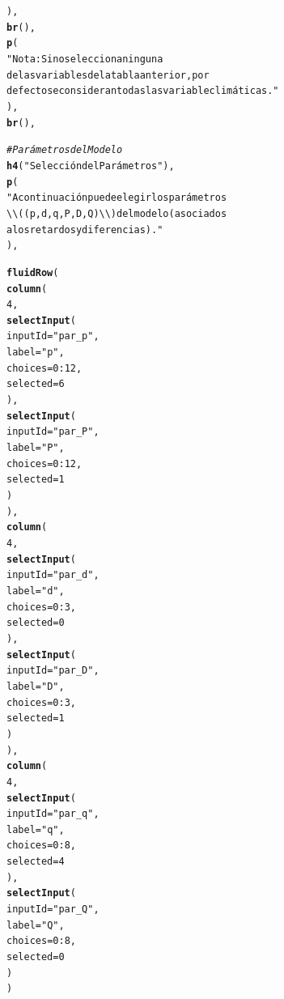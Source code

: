 \documentclass[12pt,oneside]{book}\usepackage[]{graphicx}\usepackage[]{color}
\makeatletter
\newcommand{\hlnum}[1]{\textcolor[rgb]{0.686,0.059,0.569}{#1}}%
\newcommand{\hlstr}[1]{\textcolor[rgb]{0.192,0.494,0.8}{#1}}%
\newcommand{\hlcom}[1]{\textcolor[rgb]{0.678,0.584,0.686}{\textit{#1}}}%
\newcommand{\hlopt}[1]{\textcolor[rgb]{0,0,0}{#1}}%
\newcommand{\hlstd}[1]{\textcolor[rgb]{0.345,0.345,0.345}{#1}}%
\newcommand{\hlkwc}[1]{\textcolor[rgb]{0.333,0.667,0.333}{#1}}%
\newcommand{\hlkwd}[1]{\textcolor[rgb]{0.737,0.353,0.396}{\textbf{#1}}}%
\newenvironment{kframe}{%
 \def\at@end@of@kframe{}%
 \ifinner\ifhmode%
  \def\at@end@of@kframe{\end{minipage}}%
  \begin{minipage}{\columnwidth}%
 \fi\fi%
 \def\FrameCommand##1{\hskip\@totalleftmargin \hskip-\fboxsep
 \colorbox{shadecolor}{##1}\hskip-\fboxsep
     \hskip-\linewidth \hskip-\@totalleftmargin \hskip\columnwidth}%
 \MakeFramed {\advance\hsize-\width
   \@totalleftmargin\z@ \linewidth\hsize
   \@setminipage}}%
 {\par\unskip\endMakeFramed%
 \at@end@of@kframe}
\newenvironment{knitrout}{}{} %
\theoremstyle{definition} %
\makeatother
\begin{document}
\begin{knitrout}
\begin{kframe}
\begin{alltt}
    \hlstd{),}
    \hlkwd{br}\hlstd{(),}
    \hlkwd{p}\hlstd{(}
      \hlstr{"Nota: Si no selecciona ninguna
      de las variables de la tabla anterior, por
      defecto se consideran todas las variable climáticas."}
    \hlstd{),}
    \hlkwd{br}\hlstd{(),}

    \hlcom{#Parámetros del Modelo}
    \hlkwd{h4}\hlstd{(}\hlstr{"Selección del Parámetros"}\hlstd{),}
    \hlkwd{p}\hlstd{(}
      \hlstr{"A continuación puede elegir los parámetros
      \textbackslash{}\textbackslash{}( (p,d,q,P,D,Q)\textbackslash{}\textbackslash{}) del modelo (asociados
      a los retardos y diferencias)."}
    \hlstd{),}

    \hlkwd{fluidRow}\hlstd{(}
      \hlkwd{column}\hlstd{(}
        \hlnum{4}\hlstd{,}
        \hlkwd{selectInput}\hlstd{(}
          \hlkwc{inputId} \hlstd{=} \hlstr{"par_p"}\hlstd{,}
          \hlkwc{label} \hlstd{=} \hlstr{"p"}\hlstd{,}
          \hlkwc{choices} \hlstd{=} \hlnum{0}\hlopt{:}\hlnum{12}\hlstd{,}
          \hlkwc{selected} \hlstd{=} \hlnum{6}
        \hlstd{),}
        \hlkwd{selectInput}\hlstd{(}
          \hlkwc{inputId} \hlstd{=} \hlstr{"par_P"}\hlstd{,}
          \hlkwc{label} \hlstd{=} \hlstr{"P"}\hlstd{,}
          \hlkwc{choices} \hlstd{=} \hlnum{0}\hlopt{:}\hlnum{12}\hlstd{,}
          \hlkwc{selected} \hlstd{=} \hlnum{1}
        \hlstd{)}
      \hlstd{),}
      \hlkwd{column}\hlstd{(}
        \hlnum{4}\hlstd{,}
        \hlkwd{selectInput}\hlstd{(}
          \hlkwc{inputId} \hlstd{=} \hlstr{"par_d"}\hlstd{,}
          \hlkwc{label} \hlstd{=} \hlstr{"d"}\hlstd{,}
          \hlkwc{choices} \hlstd{=} \hlnum{0}\hlopt{:}\hlnum{3}\hlstd{,}
          \hlkwc{selected} \hlstd{=} \hlnum{0}
        \hlstd{),}
        \hlkwd{selectInput}\hlstd{(}
          \hlkwc{inputId} \hlstd{=} \hlstr{"par_D"}\hlstd{,}
          \hlkwc{label} \hlstd{=} \hlstr{"D"}\hlstd{,}
          \hlkwc{choices} \hlstd{=} \hlnum{0}\hlopt{:}\hlnum{3}\hlstd{,}
          \hlkwc{selected} \hlstd{=} \hlnum{1}
        \hlstd{)}
      \hlstd{),}
      \hlkwd{column}\hlstd{(}
        \hlnum{4}\hlstd{,}
        \hlkwd{selectInput}\hlstd{(}
          \hlkwc{inputId} \hlstd{=} \hlstr{"par_q"}\hlstd{,}
          \hlkwc{label} \hlstd{=} \hlstr{"q"}\hlstd{,}
          \hlkwc{choices} \hlstd{=} \hlnum{0}\hlopt{:}\hlnum{8}\hlstd{,}
          \hlkwc{selected} \hlstd{=} \hlnum{4}
        \hlstd{),}
        \hlkwd{selectInput}\hlstd{(}
          \hlkwc{inputId} \hlstd{=} \hlstr{"par_Q"}\hlstd{,}
          \hlkwc{label} \hlstd{=} \hlstr{"Q"}\hlstd{,}
          \hlkwc{choices} \hlstd{=} \hlnum{0}\hlopt{:}\hlnum{8}\hlstd{,}
          \hlkwc{selected} \hlstd{=} \hlnum{0}
        \hlstd{)}
      \hlstd{)}


\end{alltt}
\end{kframe}
\end{knitrout}
\end{document}
